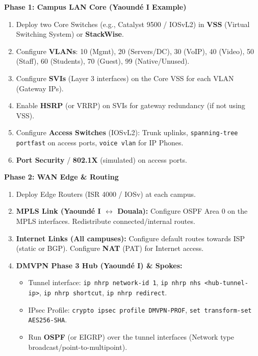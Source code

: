 \documentclass[11pt]{article}
\begin{document}
\begin{methode}
\textbf{Phase 1: Campus LAN Core (Yaoundé I Example)}
\begin{enumerate}
    \item Deploy two Core Switches (e.g., Catalyst 9500 / IOSvL2) in \textbf{VSS} (Virtual Switching System) or \textbf{StackWise}.
    \item Configure \textbf{VLANs}: 10 (Mgmt), 20 (Servers/DC), 30 (VoIP), 40 (Video), 50 (Staff), 60 (Students), 70 (Guest), 99 (Native/Unused).
    \item Configure \textbf{SVIs} (Layer 3 interfaces) on the Core VSS for each VLAN (Gateway IPs).
    \item Enable \textbf{HSRP} (or VRRP) on SVIs for gateway redundancy (if not using VSS).
    \item Configure \textbf{Access Switches} (IOSvL2): Trunk uplinks, \texttt{spanning-tree portfast} on access ports, \texttt{voice vlan} for IP Phones.
    \item \textbf{Port Security} / \textbf{802.1X} (simulated) on access ports.
\end{enumerate}

\textbf{Phase 2: WAN Edge \& Routing}
\begin{enumerate}
    \item Deploy Edge Routers (ISR 4000 / IOSv) at each campus.
    \item \textbf{MPLS Link (Yaoundé I $\leftrightarrow$ Douala):} Configure OSPF Area 0 on the MPLS interfaces. Redistribute connected/internal routes.
    \item \textbf{Internet Links (All campuses):} Configure default routes towards ISP (static or BGP). Configure \textbf{NAT} (PAT) for Internet access.
    \item \textbf{DMVPN Phase 3 Hub (Yaoundé I) \& Spokes:}
        \begin{itemize}
            \item Tunnel interface: \texttt{ip nhrp network-id 1}, \texttt{ip nhrp nhs <hub-tunnel-ip>}, \texttt{ip nhrp shortcut}, \texttt{ip nhrp redirect}.
            \item IPsec Profile: \texttt{crypto ipsec profile DMVPN-PROF}, \texttt{set transform-set AES256-SHA}.
            \item Run \textbf{OSPF} (or EIGRP) over the tunnel interfaces (Network type broadcast/point-to-multipoint).
        \end{itemize}
\end{enumerate}


\end{methode}
\end{document}
